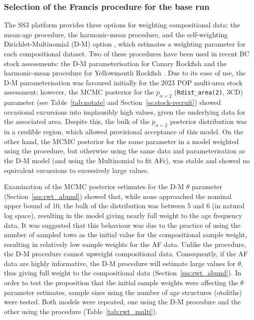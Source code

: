\documentclass[11pt]{book}
\newcommand{\code}[1]{\normalsize\texttt{#1}\normalsize}%
\begin{document}
\subsubsection{Selection of the Francis procedure for the base run} \label{sss:rwt_select}

The SS3 platform provides three options for weighting compositional data: the \citet{Francis:2011} mean-age procedure, the \citet{McAllister-Ianelli:1997} harmonic-mean procedure, and the self-weighting Dirichlet-Multinomial (D-M) option \citep{Thorson-etal:2017}, which estimates a weighting parameter for each compositional dataset.
Two of these procedures have been used in recent BC stock assessments: the D-M parameterisation for Canary Rockfish \citep{Starr-Haigh:2023_car} and the \citet{McAllister-Ianelli:1997} harmonic-mean procedure for Yellowmouth Rockfish \citep{Starr-Haigh:2022_ymr}.
Due to its ease of use, the D-M parameterisation was favoured initially for the 2023 POP multi-area stock assessment; however, the MCMC posterior for the $\mathring{p}_{\alpha=2}$ (\code{Rdist\_area(2)}, 3CD) parameter (see Table~\ref{tab:notate} and Section~\ref{ss:stock-recruit}) showed occasional excursions into implausibly high values, given the underlying data for the associated area.
Despite this, the bulk of the $\mathring{p}_{\alpha=2}$ posterior distribution was in a credible region, which allowed provisional acceptance of this model. 
On the other hand, the MCMC posterior for the same parameter in a model weighted using the \citet{Francis:2011} procedure, but otherwise using the same data and parameterisation as the D-M model (and using the Multinomial to fit AFs), was stable and showed no equivalent excursions to excessively large values.

Examination of the MCMC posterior estimates for the D-M $\theta$ parameter (Section~\ref{sss:rwt_abund}) showed that, while none approached the nominal upper bound of 10, the bulk of the distribution was between 5 and 6 (in natural log space), resulting in the model giving nearly full weight to the age frequency data.
It was suggested that this behaviour was due to the practice of using the number of sampled tows as the initial value for the compositional sample weight, resulting in relatively low sample weights for the AF data.
Unlike the \citet{Francis:2011} procedure, the D-M procedure cannot upweight compositional data. 
Consequently, if the AF data are highly informative, the D-M procedure will estimate large values for $\theta$, thus giving full weight to the compositional data (Section~\ref{sss:rwt_abund}). 
In order to test the proposition that the initial sample weights were affecting the $\theta$ parameter estimates, sample sizes using the number of age structures (otoliths) were tested. 
Both models were repeated, one using the D-M procedure and the other using the \cite{Francis:2011} procedure (Table~\ref{tab:rwt_multi}).
\end{document}

